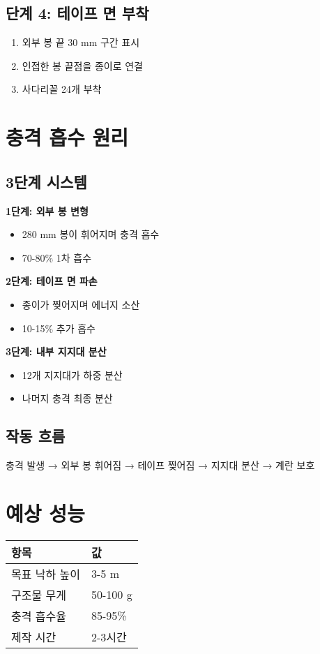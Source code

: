 \documentclass[a4paper,12pt]{article}
\begin{document}
\begin{CJK}{UTF8}{mj}
\subsection{단계 4: 테이프 면 부착}
\begin{enumerate}
    \item 외부 봉 끝 30 mm 구간 표시
    \item 인접한 봉 끝점을 종이로 연결
    \item 사다리꼴 24개 부착
\end{enumerate}

\section{충격 흡수 원리}

\subsection{3단계 시스템}

\textbf{1단계: 외부 봉 변형}
\begin{itemize}
    \item 280 mm 봉이 휘어지며 충격 흡수
    \item 70-80\% 1차 흡수
\end{itemize}

\textbf{2단계: 테이프 면 파손}
\begin{itemize}
    \item 종이가 찢어지며 에너지 소산
    \item 10-15\% 추가 흡수
\end{itemize}

\textbf{3단계: 내부 지지대 분산}
\begin{itemize}
    \item 12개 지지대가 하중 분산
    \item 나머지 충격 최종 분산
\end{itemize}

\subsection{작동 흐름}

충격 발생 → 외부 봉 휘어짐 → 테이프 찢어짐 → 지지대 분산 → 계란 보호

\section{예상 성능}

\begin{center}
\begin{tabular}{ll}
\toprule
\textbf{항목} & \textbf{값} \\
\midrule
목표 낙하 높이 & 3-5 m \\
구조물 무게 & 50-100 g \\
충격 흡수율 & 85-95\% \\
제작 시간 & 2-3시간 \\
\bottomrule
\end{tabular}
\end{center}


\end{CJK}
\end{document}
